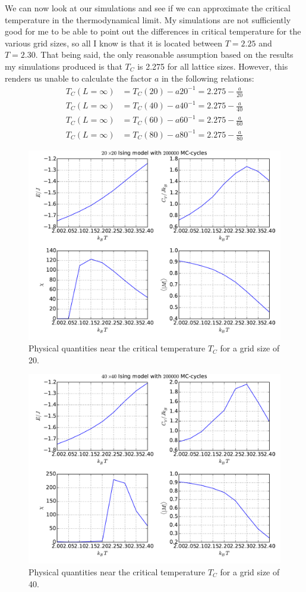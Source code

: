 We can now look at our simulations and see if we can approximate the critical
temperature in the thermodynamical limit. My simulations are not sufficiently
good for me to be able to point out the differences in critical temperature for
the various grid sizes, so all I know is that it is located between $T=2.25$
and $T=2.30$. That being said, the only reasonable assumption based on the
results my simulations produced is that $T_C$ is 2.275 for all lattice sizes.
However, this renders us unable to calculate the factor $a$ in the following relations:
\begin{align*}
  T_C(L = \infty) &= T_C(20) - a20^{-1} = 2.275 - \frac{a}{20}\\
  T_C(L = \infty) &= T_C(40) - a40^{-1} = 2.275 - \frac{a}{40}\\
  T_C(L = \infty) &= T_C(60) - a60^{-1} = 2.275 - \frac{a}{60}\\
  T_C(L = \infty) &= T_C(80) - a80^{-1} = 2.275 - \frac{a}{80}
\end{align*}
\begin{figure}
  \centering
  \includegraphics[width=0.8\linewidth]{task_f_20.pdf}
  \caption{Physical quantities near the critical temperature $T_C$ for a grid size of 20.}
  \label{fig:task_f_20}
\end{figure}

\begin{figure}
  \centering
  \includegraphics[width=0.8\linewidth]{task_f_40.pdf}
  \caption{Physical quantities near the critical temperature $T_C$ for a grid size of 40.}
  \label{fig:task_f_40}
\end{figure}

